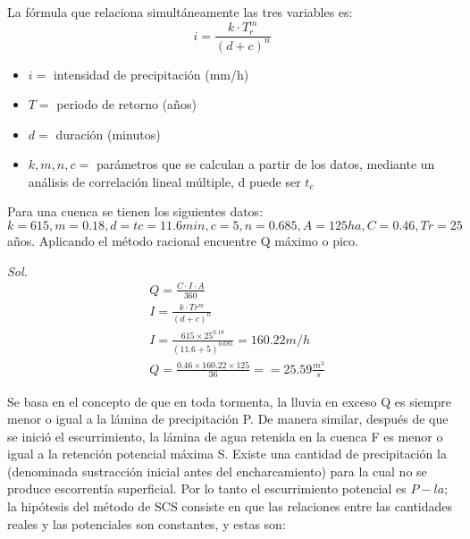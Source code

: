    La fórmula que relaciona simultáneamente las tres variables es:
    \begin{equation}
        i = \frac{k \cdot T^m_r}{(d+ c)^n}
    \end{equation}
    \begin{notation}
        \begin{itemize}
            \item $i=$ intensidad de precipitación (mm/h)
            \item $T=$ periodo de retorno (años)
            \item $d=$ duración (minutos)
            \item $k,m,n,c=$ parámetros que se calculan a partir de los datos, mediante un análisis de correlación lineal múltiple, d puede ser $t_c$
    \end{itemize}
    \end{notation}
    \begin{example}
        Para una cuenca se tienen los siguientes datos: $k=615, m=0.18, d=tc=11.6min, c=5, n=0.685, A=125ha, C=0.46, Tr=25$ años. Aplicando el método racional encuentre Q máximo o pico.
    
        \textit{ Sol. }
        \begin{align*}
            &Q = \frac{C \cdot I \cdot A}{360}\\
            &I= \frac{k\cdot Tr^m}{(d+c)^n}\\
            &I=\frac{615\times 25^{0.18}}{(11.6+5)^{0.685}}=160.22m/h\\
            &Q=\frac{0.46\times 160.22\times 125}{36} ==25.59\frac{m^3}{s}  
        \end{align*}
    \end{example}
    Se basa en el concepto de que en toda tormenta, la lluvia en exceso Q es siempre menor o igual a la lámina de precipitación P. De manera similar, después de que se inició el escurrimiento, la lámina de agua retenida en la cuenca F es menor o igual a la retención potencial máxima S. Existe una cantidad de precipitación la (denominada sustracción inicial antes del encharcamiento) para la cual no se produce escorrentía superficial. Por lo tanto el escurrimiento potencial es $P-la$; la hipótesis del método de SCS consiste en que las relaciones entre las cantidades reales y las potenciales son constantes, y estas son:
    
